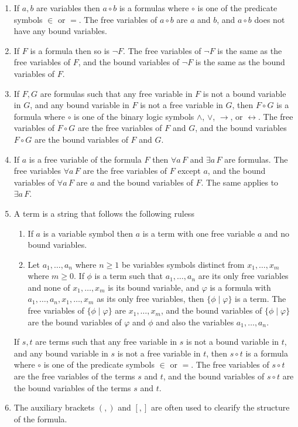 \documentclass[11pt]{book}
\newcommand{\env}[2]{\begin{#1}#2\end{#1}}
\begin{document}
\begin{enumerate}
	\item If $a,b$ are variables then $a\circ b$ is a formulas where $\circ$ is one of the predicate symbols $\in$ or $=$. The free variables of $a\circ b$ are $a$ and $b$, and $a\circ b$ does not have any bound variables.

	\item If $F$ is a formula then so is $\neg F$. The free variables of $\neg F$ is the same as the free variables of $F$, and the bound variables of $\neg F$ is the same as the bound variables of $F$.

	\item If $F,G$ are formulas such that any free variable in $F$ is not a bound variable in $G$, and any bound variable in $F$ is not a free variable in $G$, then $F\circ G$ is a formula where $\circ$ is one of the binary logic symbols $\land$, $\lor$, $\rightarrow$, or $\leftrightarrow$. The free variables of $F\circ G$ are the free variables of $F$ and $G$, and the bound variables $F\circ G$ are the bound variables of $F$ and $G$.

	\item If $a$ is a free variable of the formula $F$ then $\forall a\, F$ and $\exists a\, F$ are formulas. The free variables $\forall a\, F$ are the free variables of $F$ except $a$, and the bound variables of $\forall a\, F$ are $a$ and the bound variables of $F$. The same applies to $\exists a\, F$. 
	
	\item A term is a string that follows the following ruless
		\env{enumerate}{
			\item If $a$ is a variable symbol then $a$ is a term with one free variable $a$ and no bound variables.
			\item Let $a_1,\dots,a_n$ where $n\ge 1$ be variables symbols distinct from $x_1,\dots,x_m$ where $m\ge 0$. If $\phi$ is a term such that $a_1,\dots,a_n$ are its only free variables and none of $x_1,\dots,x_m$ is its bound variable, and $\varphi$ is a formula with $a_1,\dots,a_n,x_1,\dots,x_m$ as its only free variables, then $\{\phi\mid\varphi\}$ is a term. The free variables of $\{\phi\mid\varphi\}$ are $x_1,\dots,x_m$, and the bound variables of $\{\phi\mid\varphi\}$ are the bound variables of $\varphi$ and $\phi$ and also the variables $a_1,\dots,a_n$.
		}
		 If $s,t$ are terms such that any free variable in $s$ is not a bound variable in $t$, and any bound variable in $s$ is not a free variable in $t$, then $s\circ t$ is a formula where $\circ$ is one of the predicate symbols $\in$ or $=$. The free variables of $s\circ t$ are the free variables of the terms $s$ and $t$, and the bound variables of $s\circ t$ are the bound variables of the terms $s$ and $t$.
	\item The auxiliary brackets $(,)$ and $[,]$ are often used to clearify the structure of the formula.
\end{enumerate}
\end{document}
